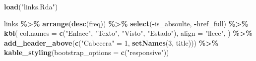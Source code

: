 \documentclass[
]{article}
\newenvironment{Shaded}{\begin{snugshade}}{\end{snugshade}}
\newcommand{\AttributeTok}[1]{\textcolor[rgb]{0.13,0.29,0.53}{#1}}
\newcommand{\DecValTok}[1]{\textcolor[rgb]{0.00,0.00,0.81}{#1}}
\newcommand{\FunctionTok}[1]{\textcolor[rgb]{0.13,0.29,0.53}{\textbf{#1}}}
\newcommand{\NormalTok}[1]{#1}
\newcommand{\OtherTok}[1]{\textcolor[rgb]{0.56,0.35,0.01}{#1}}
\newcommand{\SpecialCharTok}[1]{\textcolor[rgb]{0.81,0.36,0.00}{\textbf{#1}}}
\newcommand{\StringTok}[1]{\textcolor[rgb]{0.31,0.60,0.02}{#1}}
\begin{document}
\begin{Shaded}
\begin{Highlighting}[]
\FunctionTok{load}\NormalTok{(}\StringTok{"links.Rda"}\NormalTok{)}

\NormalTok{links }\SpecialCharTok{\%\textgreater{}\%}
  \FunctionTok{arrange}\NormalTok{(}\FunctionTok{desc}\NormalTok{(freq)) }\SpecialCharTok{\%\textgreater{}\%}
  \FunctionTok{select}\NormalTok{(}\SpecialCharTok{{-}}\NormalTok{is\_absoulte, }\SpecialCharTok{{-}}\NormalTok{href\_full) }\SpecialCharTok{\%\textgreater{}\%}
  \FunctionTok{kbl}\NormalTok{(}
    \AttributeTok{col.names =} \FunctionTok{c}\NormalTok{(}\StringTok{"Enlace"}\NormalTok{, }\StringTok{"Texto"}\NormalTok{, }\StringTok{"Visto"}\NormalTok{, }\StringTok{"Estado"}\NormalTok{),}
    \AttributeTok{align =} \StringTok{"llccc"}\NormalTok{,}
\NormalTok{  ) }\SpecialCharTok{\%\textgreater{}\%}
  \FunctionTok{add\_header\_above}\NormalTok{(}\FunctionTok{c}\NormalTok{(}\StringTok{"Cabecera"} \OtherTok{=} \DecValTok{1}\NormalTok{, }\FunctionTok{setNames}\NormalTok{(}\DecValTok{3}\NormalTok{, title))) }\SpecialCharTok{\%\textgreater{}\%}
  \FunctionTok{kable\_styling}\NormalTok{(}\AttributeTok{bootstrap\_options =} \FunctionTok{c}\NormalTok{(}\StringTok{"responsive"}\NormalTok{))}
\end{Highlighting}
\end{Shaded}
\end{document}
